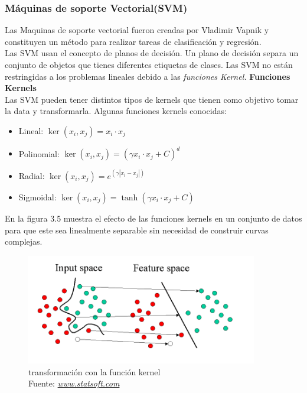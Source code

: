 \subsubsection*{Máquinas de soporte Vectorial(SVM)}
Las Maquinas de soporte vectorial fueron creadas por Vladimir Vapnik y constituyen un método para realizar tareas de clasificación y regresión.\\ Las SVM usan el concepto de planos de decisión. Un plano de decisión separa un conjunto de objetos que tienes diferentes etiquetas de clases. Las SVM no están restringidas a los problemas lineales debido a las \textit{funciones Kernel.}
\textbf{Funciones Kernels}\\
Las SVM pueden tener distintos tipos de kernels que tienen como objetivo tomar la data y transformarla. Algunas funciones kernels conocidas:
\begin{itemize}
	\item Lineal: $\ker(x_{i},x_{j})= x_{i} \cdot x_{j}$
	\item Polinomial: $\ker(x_{i},x_{j})= ( \gamma x_{i} \cdot x_{j}+C)^d$
	\item Radial: $\ker(x_{i},x_{j})= e^{(\gamma |x_{i} - x_{j}|)}$
	\item Sigmoidal: $\ker(x_{i},x_{j})= \tanh ( \gamma x_{i} \cdot x_{j}+C)$
\end{itemize}
En la figura 3.5 muestra el efecto de las funciones kernels en un conjunto de datos para que este sea linealmente separable sin necesidad de construir curvas complejas.\\
\begin{figure}[H]
	\centering
	\includegraphics[width=0.9\textwidth]{Figures/kernel.png}
	\caption{transformación con la función kernel \\ Fuente:  \href{http://www.statsoft.com/Textbook/Support-Vector-Machines}{\textit{www.statsoft.com}}}
	\label{transformación con la función kernel}
\end{figure} 

